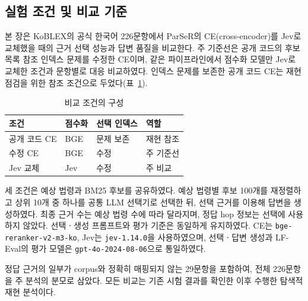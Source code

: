 
\subsection{실험 조건 및 비교 기준}
\label{sec:ch4_conditions}

본 장은 KoBLEX의 공식 한국어 226문항에서 ParSeR의
CE(cross-encoder)를 Jev로 교체했을 때의 근거 선택 성능과 답변 품질을
비교한다. 주 기준선은 공개 코드의 후보 목록 참조 인덱스 문제를 수정한
CE이며, 같은 파이프라인에서 점수화 모델만 Jev로 교체한 조건과
문항별로 대응 비교하였다. 인덱스 문제를 보존한 공개 코드 CE는
재현 점검을 위한 참조 조건으로 두었다(표~\ref{tab:ch4_conditions}).

\begin{table}[htbp]
    \centering
    \caption{비교 조건의 구성}
    \label{tab:ch4_conditions}
    \small
    \setlength{\tabcolsep}{4pt}
    \begin{tabular}{@{}llll@{}}
        \hline
        조건 & 점수화 & 선택 인덱스 & 역할 \\
        \hline
        공개 코드 CE & BGE & 문제 보존 & 재현 참조 \\
        수정 CE      & BGE & 수정      & 주 기준선 \\
        Jev 교체     & Jev & 수정      & 주 비교 \\
        \hline
    \end{tabular}
\end{table}

세 조건은 예상 법령과 BM25 후보를 공유하였다. 예상 법령별 후보
100개를 재정렬하고 상위 10개 중 하나를 공통 LLM 선택기로 선택한 뒤,
선택 근거를 이용해 답변을 생성하였다. 최종 근거 수는 예상 법령 수에
따라 달라지며, 정답 hop 정보는 선택에 사용하지 않았다.
선택ㆍ생성 프롬프트와 평가 기준은 동일하게 유지하였다.
CE는 \texttt{bge-reranker-v2-m3-ko}, Jev는 \texttt{jev-1.14.0}을
사용하였으며, 선택ㆍ답변 생성과 LF-Eval의 평가 모델은
\texttt{gpt-4o-2024-08-06}으로 통일하였다.

정답 근거의 일부가 corpus와 정확히 매핑되지 않는 29문항을 포함하여,
전체 226문항을 주 분석의 분모로 삼았다. 모든 비교는 기존 시험 결과를
확인한 이후 수행한 탐색적 재현 분석이다.
